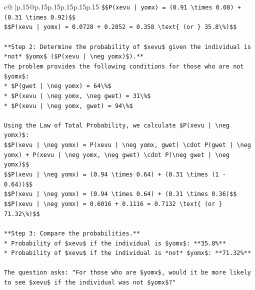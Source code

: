 \documentclass{article}
\begin{document}
{\begin{supertabular}{c@{$\;$}|p{.15\linewidth}@{}p{.15\linewidth}p{.15\linewidth}p{.15\linewidth}p{.15\linewidth}p{.15\linewidth}}
{{{\texttt{\$\$P(xevu | yomx) = (0.91 \textbackslash{}times 0.08) + (0.31 \textbackslash{}times 0.92)\$\$} \\
\texttt{\$\$P(xevu | yomx) = 0.0728 + 0.2852 = 0.358 \textbackslash{}text\{ (or \} 35.8\textbackslash{}\%)\$\$} \\
\\ 
\texttt{**Step 2: Determine the probability of \$xevu\$ given the individual is *not* \$yomx\$ (\$P(xevu | \textbackslash{}neg yomx)\$).**} \\
\texttt{The problem provides the following conditions for those who are not \$yomx\$:} \\
\texttt{*   \$P(gwet | \textbackslash{}neg yomx) = 64\textbackslash{}\%\$} \\
\texttt{*   \$P(xevu | \textbackslash{}neg yomx, \textbackslash{}neg gwet) = 31\textbackslash{}\%\$} \\
\texttt{*   \$P(xevu | \textbackslash{}neg yomx, gwet) = 94\textbackslash{}\%\$} \\
\\ 
\texttt{Using the Law of Total Probability, we calculate \$P(xevu | \textbackslash{}neg yomx)\$:} \\
\texttt{\$\$P(xevu | \textbackslash{}neg yomx) = P(xevu | \textbackslash{}neg yomx, gwet) \textbackslash{}cdot P(gwet | \textbackslash{}neg yomx) + P(xevu | \textbackslash{}neg yomx, \textbackslash{}neg gwet) \textbackslash{}cdot P(\textbackslash{}neg gwet | \textbackslash{}neg yomx)\$\$} \\
\texttt{\$\$P(xevu | \textbackslash{}neg yomx) = (0.94 \textbackslash{}times 0.64) + (0.31 \textbackslash{}times (1 {-} 0.64))\$\$} \\
\texttt{\$\$P(xevu | \textbackslash{}neg yomx) = (0.94 \textbackslash{}times 0.64) + (0.31 \textbackslash{}times 0.36)\$\$} \\
\texttt{\$\$P(xevu | \textbackslash{}neg yomx) = 0.6016 + 0.1116 = 0.7132 \textbackslash{}text\{ (or \} 71.32\textbackslash{}\%)\$\$} \\
\\ 
\texttt{**Step 3: Compare the probabilities.**} \\
\texttt{*   Probability of \$xevu\$ if the individual is \$yomx\$: **35.8\%**} \\
\texttt{*   Probability of \$xevu\$ if the individual is *not* \$yomx\$: **71.32\%**} \\
\\ 
\texttt{The question asks: "For those who are \$yomx\$, would it be more likely to see \$xevu\$ if the individual was not \$yomx\$?"} \\
}}}
\end{supertabular}}
\end{document}
